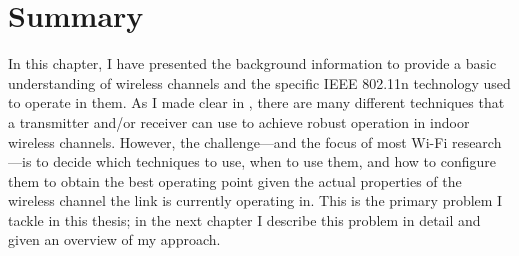 \section{Summary}
In this chapter, I have presented the background information to provide a basic understanding of wireless channels and the specific IEEE 802.11n technology used to operate in them. As I made clear in , there are many different techniques that a transmitter and/or receiver can use to achieve robust operation in indoor wireless channels. However, the challenge---and the focus of most Wi-Fi research---is to decide which techniques to use, when to use them, and how to configure them to obtain the best operating point given the actual properties of the wireless channel the link is currently operating in. This is the primary problem I tackle in this thesis; in the next chapter I describe this problem in detail and given an overview of my approach.

\ifx\mainfile\undefined

\fi
